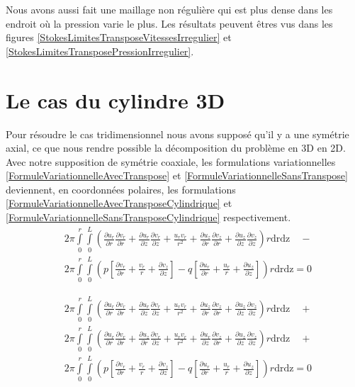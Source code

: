 \documentclass[11pt,a4paper]{article}
\numberwithin{equation}{subsection}
\numberwithin{figure}{subsection}
\begin{document}
Nous avons aussi fait une maillage non régulière qui est plus dense dans les endroit où la pression varie le plus. Les résultats peuvent êtres vus dans les figures \ref{StokesLimitesTransposeVitessesIrregulier} et \ref{StokesLimitesTransposePressionIrregulier}.

%
%
\section{Le cas du cylindre 3D}

Pour résoudre le cas tridimensionnel nous avons supposé qu'il y a une symétrie axial, ce que nous rendre possible la décomposition du problème en 3D en 2D. Avec notre supposition de symétrie coaxiale, les formulations variationnelles \ref{FormuleVariationnelleAvecTranspose} et \ref{FormuleVariationnelleSansTranspose} deviennent, en coordonnées polaires, les formulations \ref{FormuleVariationnelleAvecTransposeCylindrique} et \ref{FormuleVariationnelleSansTransposeCylindrique} respectivement.
\begin{equation}
\begin{aligned}
& 2\pi\int\limits_0^r\int\limits_0^L \left(\frac{\partial u_r}{\partial r}\frac{\partial v_r}{\partial r} + \frac{\partial u_r}{\partial z}\frac{\partial v_r}{\partial z} + \frac{u_rv_r}{r^2} + \frac{\partial u_z}{\partial r}\frac{\partial v_z}{\partial r} + \frac{\partial u_z}{\partial z}\frac{\partial v_z}{\partial z}\right)r\mathrm{drdz}  \quad- \\
& 2\pi\int\limits_0^r\int\limits_0^L \left(p\left[\frac{\partial v_r}{\partial r} + \frac{v_r}{r} + \frac{\partial v_z}{\partial z}\right] - q\left[\frac{\partial u_r}{\partial r} + \frac{u_r}{r} + \frac{\partial u_z}{\partial z}\right]\right) r\mathrm{drdz} = 0
\end{aligned} \label{FormuleVariationnelleSansTransposeCylindrique}
\end{equation}

\begin{equation}
\begin{aligned}
& 2\pi\int\limits_0^r\int\limits_0^L \left(\frac{\partial u_r}{\partial r}\frac{\partial v_r}{\partial r} + \frac{\partial u_r}{\partial z}\frac{\partial v_r}{\partial z} + \frac{u_rv_r}{r^2} + \frac{\partial u_z}{\partial r}\frac{\partial v_z}{\partial r} + \frac{\partial u_z}{\partial z}\frac{\partial v_z}{\partial z}\right)r\mathrm{drdz}  \quad+ \\
& 2\pi\int\limits_0^r\int\limits_0^L \left(\frac{\partial u_r}{\partial r}\frac{\partial v_r}{\partial r} + \frac{\partial u_z}{\partial r}\frac{\partial v_r}{\partial z} + \frac{u_rv_r}{r^2} + \frac{\partial u_r}{\partial z}\frac{\partial v_z}{\partial r} + \frac{\partial u_z}{\partial z}\frac{\partial v_z}{\partial z}\right)r\mathrm{drdz}  \quad+ \\
& 2\pi\int\limits_0^r\int\limits_0^L \left(p\left[\frac{\partial v_r}{\partial r} + \frac{v_r}{r} + \frac{\partial v_z}{\partial z}\right] - q\left[\frac{\partial u_r}{\partial r} + \frac{u_r}{r} + \frac{\partial u_z}{\partial z}\right]\right) r\mathrm{drdz} = 0
\end{aligned} \label{FormuleVariationnelleAvecTransposeCylindrique}
\end{equation}
\end{document}
